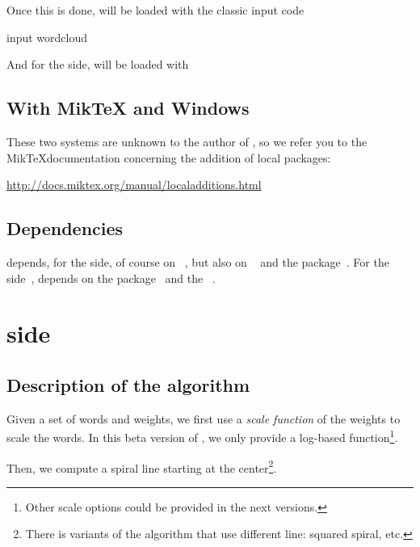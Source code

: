 \documentclass[english]{ltxdoc}
\begin{document}
Once this is done, \wordcloudpkg will be loaded with the classic \MP{}
input code
\begin{mpcode}
input wordcloud
\end{mpcode}

And for the  side, \wordcloudpkg will be loaded with
\begin{latexcode}
\usepackage{wordcloud}
\end{latexcode}

\subsection{With Mik\TeX{} and Windows}

These two systems are unknown to the author of \wordcloudpkg, so we
refer you to the Mik\TeX documentation concerning the addition of local packages:
\begin{center}
  \url{http://docs.miktex.org/manual/localadditions.html}
\end{center}



\subsection{Dependencies}


\wordcloudpkg depends, for the \MP side, of course on \MP~\cite{ctan-metapost},
but also on ~\cite{ctan-metapost-colorbrewer} and the
 package~\cite{ctan-latexmp}. For the  side~\cite{ctan-lualatex-doc},
\wordcloudpkg depends on  the  package~\cite{ctan-luamplib}
and the ~\cite{ctan-xcolor}.


\section{ side}

\subsection{Description of the algorithm}

Given a set of words and weights, we first use a
\emph{scale function} of the weights to scale the words. In this beta version of
, we only provide a log-based function\footnote{Other scale
options could be provided in the next versions.}. 

Then, we compute a spiral line starting at the center\footnote{There is variants
of the algorithm that use different line: squared spiral, etc.}.
\end{document}
